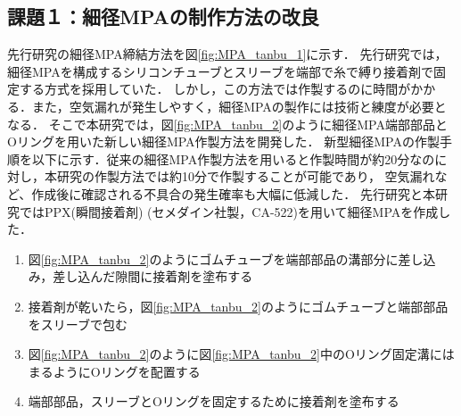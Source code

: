 \subsection{課題１：細径MPAの制作方法の改良}
先行研究\cite{hasegawa}の細径MPA締結方法を図\ref{fig:MPA_tanbu_1}に示す．
先行研究\cite{hasegawa}では，細径MPAを構成するシリコンチューブとスリーブを端部で糸で縛り接着剤で固定する方式を採用していた．
しかし，この方法では作製するのに時間がかかる．また，空気漏れが発生しやすく，細径MPAの製作には技術と練度が必要となる．
そこで本研究では，図\ref{fig:MPA_tanbu_2}のように細径MPA端部部品とOリングを用いた新しい細径MPA作製方法を開発した．
新型細径MPAの作製手順を以下に示す．従来の細径MPA作製方法を用いると作製時間が約20分なのに対し，本研究の作製方法では約10分で作製することが可能であり，
空気漏れなど、作成後に確認される不具合の発生確率も大幅に低減した．
先行研究と本研究ではPPX(瞬間接着剤) (セメダイン社製，CA-522)を用いて細径MPAを作成した．
\begin{enumerate}
  \item 図\ref{fig:MPA_tanbu_2}のようにゴムチューブを端部部品の溝部分に差し込み，差し込んだ隙間に接着剤を塗布する
  \item 接着剤が乾いたら，図\ref{fig:MPA_tanbu_2}のようにゴムチューブと端部部品をスリーブで包む
  \item 図\ref{fig:MPA_tanbu_2}のように図\ref{fig:MPA_tanbu_2}中のOリング固定溝にはまるようにOリングを配置する
  \item 端部部品，スリーブとOリングを固定するために接着剤を塗布する
\end{enumerate}
